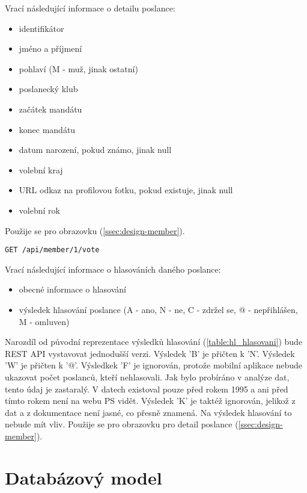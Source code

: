 \noindent Vrací následující informace o detailu poslance:

\begin{itemize}
	\item identifikátor
	\item jméno a příjmení
	\item pohlaví (M - muž, jinak ostatní)
	\item poslanecký klub
	\item začátek mandátu
	\item konec mandátu
	\item datum narození, pokud známo, jinak null
	\item volební kraj
	\item URL odkaz na profilovou fotku, pokud existuje, jinak null
	\item volební rok
\end{itemize}

\noindent Použije se pro obrazovku (\ref{ssec:design-member}).

\vspace{10px}

\begin{lstlisting}[label={lst:endpoint-member-votes}] 
GET /api/member/1/vote
\end{lstlisting}

\noindent Vrací následující informace o hlasováních daného poslance:

\begin{itemize}
\item obecné informace o hlasování
\item výsledek hlasování poslance (A - ano, N - ne, C - zdržel se, @ - nepřihlášen, M - omluven)
\end{itemize}

\noindent Narozdíl od původní reprezentace výsledků hlasování (\ref{table:hl_hlasovani}) bude REST API vystavovat jednodušší verzi. Výsledek 'B' je přičten k 'N'. Výsledek 'W' je přičten k '@'. Výsledkek 'F' je ignorován, protože mobilní aplikace nebude ukazovat počet poslanců, kteří nehlasovali. Jak bylo probíráno v analýze dat, tento údaj je zastaralý. V datech existoval pouze před rokem 1995 a ani před tímto rokem není na webu PS vidět. Výsledek 'K' je taktéž ignorován, jelikož z dat a z dokumentace není jasné, co přesně znamená. Na výsledek hlasování to nebude mít vliv. Použije se pro obrazovku pro detail poslance (\ref{ssec:design-member}).

\section{Databázový model}
\label{sec:database_model}

